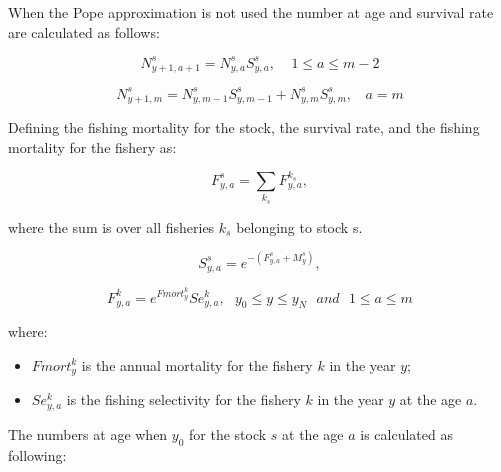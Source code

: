\documentclass{article}
\begin{document}
\hfill

When the Pope approximation is not used the number at age and survival rate are calculated as follows:

\begin{equation}
N^s_{y+1,a+1}=N^s_{y,a}S^s_{y,a}, \ \ \ \ \ 1\leq a \leq m-2
\end{equation}

\begin{equation}
N^s_{y+1,m}=N^s_{y,m-1}S^s_{y,m-1}+N^s_{y,m}S^s_{y,m}, \ \ \ \ a = m
\end{equation}

Defining the fishing mortality for the stock, the survival rate, and the fishing mortality for the fishery as:

\begin{equation}
F^s_{y,a} = \sum_{k_s}F^{k_s}_{y,a}, 
\end{equation}

where the sum is over all fisheries $k_s$ belonging to stock s.

\begin{equation}
S^s_{y,a}=e^{-(F^s_{y,a}+M^{s}_{y})},
\end{equation}

\begin{equation}
F^k_{y,a}=e^{Fmort^k_y}Se^k_{y,a}, \ \ \ y_0\leq y \leq y_N \ \ \ and  \ \ \  1\leq a \leq m
\end{equation}

where:
\begin{itemize}

    
    \item $Fmort^k_y$ is the annual mortality for the fishery $k$ in the year $y$;
    \item $Se^k_{y,a}$ is the fishing selectivity for the fishery $k$ in the year $y$ at the age $a$.

\end{itemize}

\hfill

The numbers at age when $y_0$ for the stock $s$ at the age $a$ is calculated as following:
\end{document}
